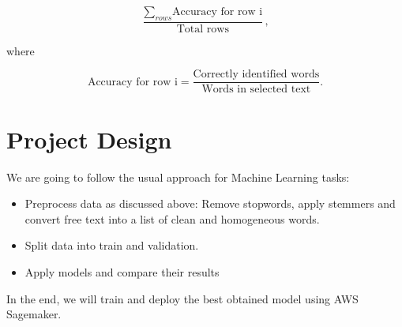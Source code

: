 \documentclass[11pt]{article}
\begin{document}
\[ 
\frac{\sum_{rows}\text{Accuracy for row i}}{\text{Total rows}},
\]

where

\[ 
\text{Accuracy for row i} = \frac{\text{Correctly identified words}}{\text{Words in selected text}}.
\]

\section{Project Design}

We are going to follow the usual approach for Machine Learning tasks:

\begin{itemize}
    \item Preprocess data as discussed above: Remove stopwords, apply stemmers and convert free text into a list of clean and homogeneous words.
    \item Split data into train and validation.
    \item Apply models and compare their results
\end{itemize}

In the end, we will train and deploy the best obtained model using AWS Sagemaker.
\end{document}

